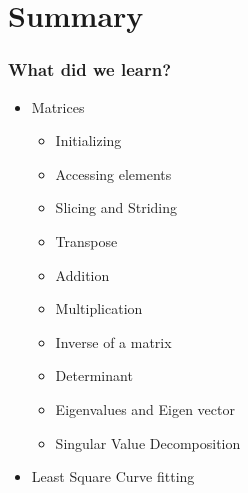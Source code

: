 \documentclass[14pt,compress]{beamer}
\begin{document}
\section{Summary}
\begin{frame}
  \frametitle{What did we learn?}
  \begin{itemize}
  \item Matrices
    \begin{itemize}
      \item Initializing
      \item Accessing elements
      \item Slicing and Striding
      \item Transpose
      \item Addition
      \item Multiplication
      \item Inverse of a matrix
      \item Determinant
      \item Eigenvalues and Eigen vector
      \item Singular Value Decomposition
    \end{itemize}
  \item Least Square Curve fitting
  \end{itemize}
\end{frame}
\end{document}
